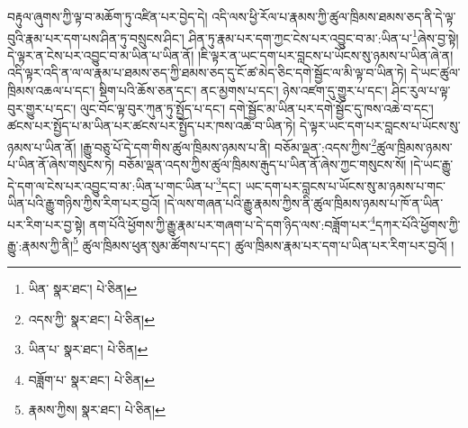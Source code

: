 བརྟུལ་ཞུགས་ཀྱི་ལྟ་བ་མཆོག་ཏུ་འཛིན་པར་བྱེད་དེ། འདི་ལས་ཕྱི་རོལ་པ་རྣམས་ཀྱི་ཚུལ་ཁྲིམས་ཐམས་ཅད་ནི་དེ་ལྟ་བུའི་རྣམ་པར་དག་པས་ཤིན་ཏུ་བསྲུངས་ཤིང་། ཤིན་ཏུ་རྣམ་པར་དག་ཀྱང་ངེས་པར་འབྱུང་བ་མ་:ཡིན་པ་\footnote{ཡིན་  སྣར་ཐང་།  པེ་ཅིན། }ཞེས་བྱ་སྟེ། དེ་ལྟར་ན་ངེས་པར་འབྱུང་བ་མ་ཡིན་པ་ཡིན་ནོ། །ཇི་ལྟར་ན་ཡང་དག་པར་བླངས་པ་ཡོངས་སུ་ཉམས་པ་ཡིན་ཞེ་ན། འདི་ལྟར་འདི་ན་ལ་ལ་རྣམ་པ་ཐམས་ཅད་ཀྱི་ཐམས་ཅད་དུ་ངོ་ཚ་མེད་ཅིང་དགེ་སྦྱོང་ལ་མི་ལྟ་བ་ཡིན་ཏེ། དེ་ཡང་ཚུལ་ཁྲིམས་འཆལ་པ་དང་། སྡིག་པའི་ཆོས་ཅན་དང་། ནང་མྱགས་པ་དང་། ཉེས་འཛག་དུ་གྱུར་པ་དང་། ཤིང་རུལ་པ་ལྟ་བུར་གྱུར་པ་དང་། ལུང་བོང་ལྟ་བུར་ཀུན་ཏུ་སྤྱོད་པ་དང་། དགེ་སྦྱོང་མ་ཡིན་པར་དགེ་སྦྱོང་དུ་ཁས་འཆེ་བ་དང་། ཚངས་པར་སྤྱོད་པ་མ་ཡིན་པར་ཚངས་པར་སྤྱོད་པར་ཁས་འཆེ་བ་ཡིན་ཏེ། དེ་ལྟར་ཡང་དག་པར་བླངས་པ་ཡོངས་སུ་ཉམས་པ་ཡིན་ནོ། །རྒྱུ་བཅུ་པོ་དེ་དག་གིས་ཚུལ་ཁྲིམས་ཉམས་པ་ནི། བཅོམ་ལྡན་:འདས་ཀྱིས་\footnote{འདས་ཀྱི་  སྣར་ཐང་།  པེ་ཅིན། }ཚུལ་ཁྲིམས་ཉམས་པ་ཡིན་ནོ་ཞེས་གསུངས་ཏེ། བཅོམ་ལྡན་འདས་ཀྱིས་ཚུལ་ཁྲིམས་རྒུད་པ་ཡིན་ནོ་ཞེས་ཀྱང་གསུངས་སོ། །དེ་ཡང་རྒྱུ་དེ་དག་ལ་ངེས་པར་འབྱུང་བ་མ་:ཡིན་པ་གང་ཡིན་པ་\footnote{ཡིན་པ་  སྣར་ཐང་།  པེ་ཅིན། }དང་། ཡང་དག་པར་བླངས་པ་ཡོངས་སུ་མ་ཉམས་པ་གང་ཡིན་པའི་རྒྱུ་གཉིས་ཀྱིས་རིག་པར་བྱའོ། །དེ་ལས་གཞན་པའི་རྒྱུ་རྣམས་ཀྱིས་ནི་ཚུལ་ཁྲིམས་ཉམས་པ་ཁོ་ན་ཡིན་པར་རིག་པར་བྱ་སྟེ། ནག་པོའི་ཕྱོགས་ཀྱི་རྒྱུ་རྣམ་པར་གཞག་པ་དེ་དག་ཉིད་ལས་:བཟློག་པར་\footnote{བཟློག་པ་  སྣར་ཐང་།  པེ་ཅིན། }དཀར་པོའི་ཕྱོགས་ཀྱི་རྒྱུ་:རྣམས་ཀྱི་ནི།\footnote{རྣམས་ཀྱིས།  སྣར་ཐང་།  པེ་ཅིན། } ཚུལ་ཁྲིམས་ཕུན་སུམ་ཚོགས་པ་དང་། ཚུལ་ཁྲིམས་རྣམ་པར་དག་པ་ཡིན་པར་རིག་པར་བྱའོ། །

